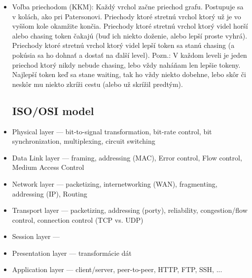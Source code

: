 \documentclass[paper=a4, fontsize=11pt]{scrartcl} %
\numberwithin{equation}{section} %
\numberwithin{figure}{section} %
\numberwithin{table}{section} %
\begin{document}
\begin{itemize}
	\item Voľba priechodom (KKM): Každý vrchol začne priechod grafu. Postupuje sa v kolách, ako pri Patersonovi. Priechody ktoré stretnú vrchol ktorý už je vo vyššom kole okamžite končia. Priechody ktoré stretnú vrchol ktorý videl horší alebo chasing token čakajú (buď ich niekto doženie, alebo lepší proste vyhrá). Priechody ktoré stretnú vrchol ktorý videl lepší token sa stanú chasing (a pokúsia sa ho dohnať a dostať na ďalší level). Pozn.: V každom leveli je jeden priechod ktorý nikdy nebude chasing, lebo vždy naháňam len lepšie tokeny. Najlepší token keď sa stane waiting, tak ho vždy niekto dobehne, lebo skôr či neskôr mu niekto zkríži cestu (alebo už skrížil predtým).
	
	\subsection{ISO/OSI model}
	
	\item Physical layer — bit-to-signal transformation, bit-rate control, bit synchronization, multiplexing, circuit switching
	\item Data Link layer — framing, addressing (MAC), Error control, Flow control, Medium Access Control
	\item Network layer — packetizing, internetworking (WAN), fragmenting, addressing (IP), Routing
	\item Transport layer — packetizing, addressing (porty), reliability, congestion/flow control, connection control (TCP vs. UDP)
	\item Session layer — 
	\item Presentation layer — transformácie dát
	\item Application layer — client/server, peer-to-peer, HTTP, FTP, SSH, ... 
\end{itemize}
\end{document}
